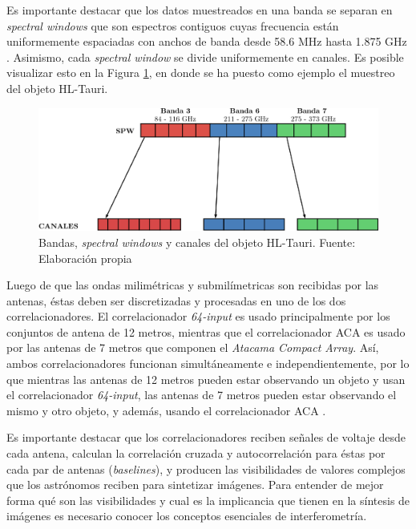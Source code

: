Es importante destacar que los datos muestreados en una banda se separan en \textit{spectral windows} que son espectros contiguos cuyas frecuencia están uniformemente espaciadas con anchos de banda desde 58.6 MHz hasta 1.875 GHz \citep{alma-handbook}. Asimismo, cada \textit{spectral window} se divide uniformemente en canales. Es posible visualizar esto en la Figura \ref{fig:division}, en donde se ha puesto como ejemplo el muestreo del objeto HL-Tauri.

\begin{figure}[h!]
\centering
\includegraphics[scale=0.15]{images/frecuencias.png}
\caption{Bandas, \textit{spectral windows} y canales del objeto HL-Tauri. Fuente: Elaboración propia}
\label{fig:division}
\end{figure}

   


Luego de que las ondas milimétricas y submilímetricas son recibidas por las antenas, éstas deben ser discretizadas y procesadas en uno de los dos correlacionadores. El correlacionador \textit{64-input} es usado principalmente por los conjuntos de antena de 12 metros, mientras que el correlacionador ACA es usado por las antenas de 7 metros que componen el \textit{Atacama Compact Array}. Así, ambos correlacionadores funcionan simultáneamente e independientemente, por lo que mientras las antenas de 12 metros pueden estar observando un objeto y usan el correlacionador \textit{64-input}, las antenas de 7 metros pueden estar observando el mismo y otro objeto, y además, usando el correlacionador ACA \citep{alma-handbook}. 

Es importante destacar que los correlacionadores reciben señales de voltaje desde cada antena, calculan la correlación cruzada y autocorrelación para éstas por cada par de antenas (\textit{baselines}), y producen las visibilidades de valores complejos que los astrónomos reciben para sintetizar imágenes. Para entender de mejor forma qué son las visibilidades y cual es la implicancia que tienen en la síntesis de imágenes es necesario conocer los conceptos esenciales de interferometría.

